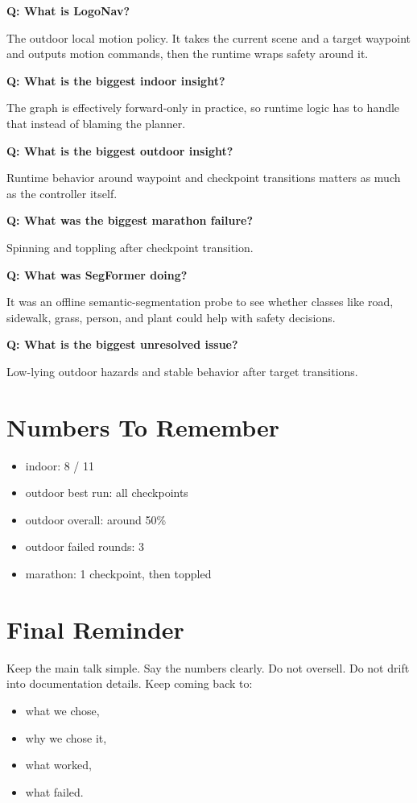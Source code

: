 \documentclass[11pt]{article}
\begin{document}
\textbf{Q: What is LogoNav?}

The outdoor local motion policy. It takes the current scene and a target waypoint and outputs motion commands, then the runtime wraps safety around it.

\textbf{Q: What is the biggest indoor insight?}

The graph is effectively forward-only in practice, so runtime logic has to handle that instead of blaming the planner.

\textbf{Q: What is the biggest outdoor insight?}

Runtime behavior around waypoint and checkpoint transitions matters as much as the controller itself.

\textbf{Q: What was the biggest marathon failure?}

Spinning and toppling after checkpoint transition.

\textbf{Q: What was SegFormer doing?}

It was an offline semantic-segmentation probe to see whether classes like road, sidewalk, grass, person, and plant could help with safety decisions.

\textbf{Q: What is the biggest unresolved issue?}

Low-lying outdoor hazards and stable behavior after target transitions.

\section*{Numbers To Remember}
\begin{itemize}[leftmargin=*]
\item indoor: 8 / 11
\item outdoor best run: all checkpoints
\item outdoor overall: around 50\%
\item outdoor failed rounds: 3
\item marathon: 1 checkpoint, then toppled
\end{itemize}

\section*{Final Reminder}
Keep the main talk simple. Say the numbers clearly. Do not oversell. Do not drift into documentation details. Keep coming back to:
\begin{itemize}[leftmargin=*]
\item what we chose,
\item why we chose it,
\item what worked,
\item what failed.
\end{itemize}
\end{document}
